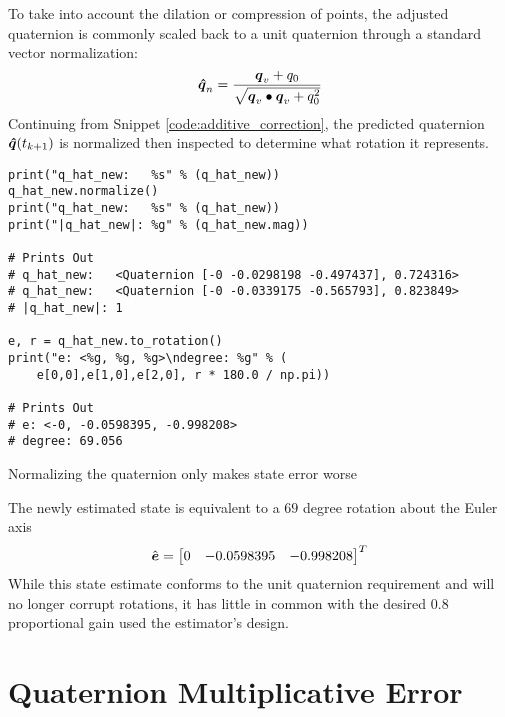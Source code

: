 To take into account the dilation or compression of points, the adjusted quaternion is commonly scaled back to a unit quaternion through a standard vector normalization:
\begin{equation}
  \boldsymbol{\hat{q}}_n = \frac{\boldsymbol{q}_v + q_0}{\sqrt{\boldsymbol{q}_v \bullet \boldsymbol{q}_v + q_0^2}}
  \label{eqn:NormalizeQuaternion}
\end{equation}
Continuing from Snippet \ref{code:additive_correction}, the predicted quaternion $\boldsymbol{\hat{q}}(t_{k+1})$ is normalized then inspected to determine what rotation it represents.
\begin{listing}
\begin{singlespace}
  \begin{verbatim}
print("q_hat_new:   %s" % (q_hat_new))
q_hat_new.normalize()
print("q_hat_new:   %s" % (q_hat_new))
print("|q_hat_new|: %g" % (q_hat_new.mag))

# Prints Out
# q_hat_new:   <Quaternion [-0 -0.0298198 -0.497437], 0.724316>
# q_hat_new:   <Quaternion [-0 -0.0339175 -0.565793], 0.823849>
# |q_hat_new|: 1

e, r = q_hat_new.to_rotation()
print("e: <%g, %g, %g>\ndegree: %g" % (
    e[0,0],e[1,0],e[2,0], r * 180.0 / np.pi))

# Prints Out
# e: <-0, -0.0598395, -0.998208>
# degree: 69.056
  \end{verbatim}
\caption{Normalizing the quaternion only makes state error worse}
\label{code:normalized_no_work}
\nocite{minted}
\end{singlespace}
\end{listing}

The newly estimated state is equivalent to a $69$ degree rotation about the Euler axis
\begin{equation}
  \hat{\boldsymbol{e}} = \begin{bmatrix} 0 & -0.0598395 & -0.998208 \end{bmatrix}^T
\end{equation}
While this state estimate conforms to the unit quaternion requirement and will no longer corrupt rotations, it has little in common with the desired $0.8$ proportional gain used the estimator's design.



\section{Quaternion Multiplicative Error}
\label{sec:QuaternionMultiplicativeError}

